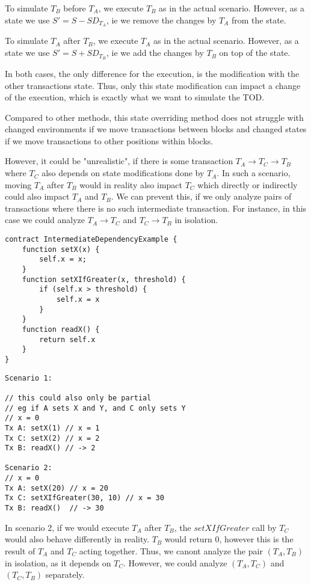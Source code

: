 \documentclass[draft,final]{vutinfth} %
\begin{document}
To simulate $T_B$ before $T_A$, we execute $T_B$ as in the actual scenario. However, as a state we use $S\prime = S - SD_{T_A}$, ie we remove the changes by $T_A$ from the state.

To simulate $T_A$ after $T_B$, we execute $T_A$ as in the actual scenario. However, as a state we use $S\prime = S + SD_{T_B}$, ie we add the changes by $T_B$ on top of the state.

In both cases, the only difference for the execution, is the modification with the other transactions state. Thus, only this state modification can impact a change of the execution, which is exactly what we want to simulate the TOD.

Compared to other methods, this state overriding method does not struggle with changed environments if we move transactions between blocks and changed states if we move transactions to other positions within blocks.

However, it could be "unrealistic", if there is some transaction $T_A \rightarrow T_C \rightarrow T_B$ where $T_C$ also depends on state modifications done by $T_A$. In such a scenario, moving $T_A$ after $T_B$ would in reality also impact $T_C$ which directly or indirectly could also impact $T_A$ and $T_B$. We can prevent this, if we only analyze pairs of transactions where there is no such intermediate transaction. For instance, in this case we could analyze $T_A \rightarrow T_C$ and $T_C \rightarrow T_B$ in isolation.

\begin{verbatim}
contract IntermediateDependencyExample {
    function setX(x) {
        self.x = x;
    }
    function setXIfGreater(x, threshold) {
        if (self.x > threshold) {
            self.x = x
        }
    }
    function readX() {
        return self.x
    }
}
\end{verbatim}

\begin{verbatim}
Scenario 1:

// this could also only be partial
// eg if A sets X and Y, and C only sets Y
// x = 0
Tx A: setX(1) // x = 1
Tx C: setX(2) // x = 2
Tx B: readX() // -> 2

Scenario 2:
// x = 0
Tx A: setX(20) // x = 20
Tx C: setXIfGreater(30, 10) // x = 30
Tx B: readX()  // -> 30
\end{verbatim}

In scenario 2, if we would execute $T_A$ after $T_B$, the $setXIfGreater$ call by $T_C$ would also behave differently in reality. $T_B$ would return $0$, however this is the result of $T_A$ and $T_C$ acting together. Thus, we canont analyze the pair $(T_A, T_B)$ in isolation, as it depends on $T_C$. However, we could analyze $(T_A, T_C)$ and $(T_C, T_B)$ separately.
\end{document}
